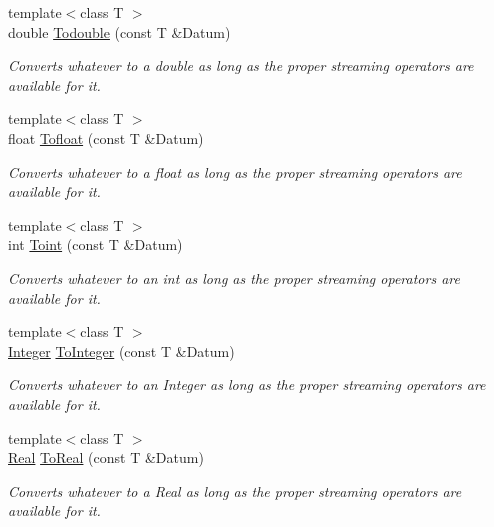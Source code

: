 \begin{DoxyCompactItemize}
{\footnotesize template$<$class T $>$ }\\double \hyperlink{namespacephys_aa89192e0bb495fdf141649f5abd88963}{Todouble} (const T \&Datum)
\begin{DoxyCompactList}\small\item\em Converts whatever to a double as long as the proper streaming operators are available for it. \item\end{DoxyCompactList}\item 
{\footnotesize template$<$class T $>$ }\\float \hyperlink{namespacephys_a8f892c12296033f70cc95c43f5c7e85c}{Tofloat} (const T \&Datum)
\begin{DoxyCompactList}\small\item\em Converts whatever to a float as long as the proper streaming operators are available for it. \item\end{DoxyCompactList}\item 
{\footnotesize template$<$class T $>$ }\\int \hyperlink{namespacephys_af0a6dfb0aa9e9292b96a0273e1f49d3a}{Toint} (const T \&Datum)
\begin{DoxyCompactList}\small\item\em Converts whatever to an int as long as the proper streaming operators are available for it. \item\end{DoxyCompactList}\item 
{\footnotesize template$<$class T $>$ }\\\hyperlink{namespacephys_a7f09bf5585b2bb97613cd9aad4273a81}{Integer} \hyperlink{namespacephys_a7fe8a4cf645e000483652f26ef8d6e47}{ToInteger} (const T \&Datum)
\begin{DoxyCompactList}\small\item\em Converts whatever to an Integer as long as the proper streaming operators are available for it. \item\end{DoxyCompactList}\item 
{\footnotesize template$<$class T $>$ }\\\hyperlink{namespacephys_af7eb897198d265b8e868f45240230d5f}{Real} \hyperlink{namespacephys_ac5ff9d58be770f2fe8c4928eb160c88a}{ToReal} (const T \&Datum)
\begin{DoxyCompactList}\small\item\em Converts whatever to a Real as long as the proper streaming operators are available for it. \item\end{DoxyCompactList}\item 

\end{DoxyCompactItemize}

